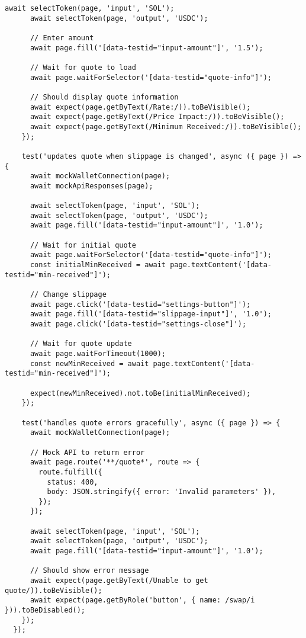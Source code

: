\documentclass[11pt,a4paper]{article}
\begin{document}
\begin{lstlisting}[style=typescript, caption=E2E Test Implementation]
      await selectToken(page, 'input', 'SOL');
      await selectToken(page, 'output', 'USDC');

      // Enter amount
      await page.fill('[data-testid="input-amount"]', '1.5');

      // Wait for quote to load
      await page.waitForSelector('[data-testid="quote-info"]');

      // Should display quote information
      await expect(page.getByText(/Rate:/)).toBeVisible();
      await expect(page.getByText(/Price Impact:/)).toBeVisible();
      await expect(page.getByText(/Minimum Received:/)).toBeVisible();
    });

    test('updates quote when slippage is changed', async ({ page }) => {
      await mockWalletConnection(page);
      await mockApiResponses(page);

      await selectToken(page, 'input', 'SOL');
      await selectToken(page, 'output', 'USDC');
      await page.fill('[data-testid="input-amount"]', '1.0');

      // Wait for initial quote
      await page.waitForSelector('[data-testid="quote-info"]');
      const initialMinReceived = await page.textContent('[data-testid="min-received"]');

      // Change slippage
      await page.click('[data-testid="settings-button"]');
      await page.fill('[data-testid="slippage-input"]', '1.0');
      await page.click('[data-testid="settings-close"]');

      // Wait for quote update
      await page.waitForTimeout(1000);
      const newMinReceived = await page.textContent('[data-testid="min-received"]');

      expect(newMinReceived).not.toBe(initialMinReceived);
    });

    test('handles quote errors gracefully', async ({ page }) => {
      await mockWalletConnection(page);

      // Mock API to return error
      await page.route('**/quote*', route => {
        route.fulfill({
          status: 400,
          body: JSON.stringify({ error: 'Invalid parameters' }),
        });
      });

      await selectToken(page, 'input', 'SOL');
      await selectToken(page, 'output', 'USDC');
      await page.fill('[data-testid="input-amount"]', '1.0');

      // Should show error message
      await expect(page.getByText(/Unable to get quote/)).toBeVisible();
      await expect(page.getByRole('button', { name: /swap/i })).toBeDisabled();
    });
  });


\end{lstlisting}
\end{document}
